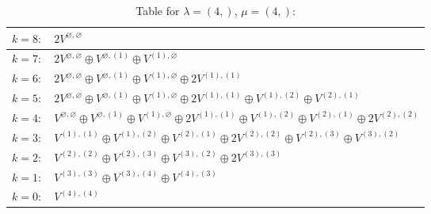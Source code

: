 \documentclass[a4paper,12pt]{article}
\begin{document}
\renewcommand{\arraystretch}{1.6} 
\begin{table}[H]
\centering
\caption{Table for $\lambda = (4,)$, $\mu = (4,)$:}
\begin{tabular}{|>{\centering\arraybackslash}p{15cm}|}
\hline
 $k = 8: \quad 2 V^{\varnothing, \varnothing} $ \\ \hline
 $k = 7: \quad 2 V^{\varnothing, \varnothing} \oplus V^{\varnothing, (1)} \oplus V^{(1), \varnothing} $ \\ \hline
 $k = 6: \quad 2 V^{\varnothing, \varnothing} \oplus V^{\varnothing, (1)} \oplus V^{(1), \varnothing} \oplus 2 V^{(1), (1)} $ \\ \hline
 $k = 5: \quad 2 V^{\varnothing, \varnothing} \oplus V^{\varnothing, (1)} \oplus V^{(1), \varnothing} \oplus 2 V^{(1), (1)} \oplus V^{(1), (2)} \oplus V^{(2), (1)} $ \\ \hline
 $k = 4: \quad V^{\varnothing, \varnothing} \oplus V^{\varnothing, (1)} \oplus V^{(1), \varnothing} \oplus 2 V^{(1), (1)} \oplus V^{(1), (2)} \oplus V^{(2), (1)} \oplus 2 V^{(2), (2)} $ \\ \hline
 $k = 3: \quad V^{(1), (1)} \oplus V^{(1), (2)} \oplus V^{(2), (1)} \oplus 2 V^{(2), (2)} \oplus V^{(2), (3)} \oplus V^{(3), (2)} $ \\ \hline
 $k = 2: \quad V^{(2), (2)} \oplus V^{(2), (3)} \oplus V^{(3), (2)} \oplus 2 V^{(3), (3)} $ \\ \hline
 $k = 1: \quad V^{(3), (3)} \oplus V^{(3), (4)} \oplus V^{(4), (3)} $ \\ \hline
 $k = 0: \quad V^{(4), (4)} $ \\ \hline
\end{tabular}
\end{table}
\end{document}
